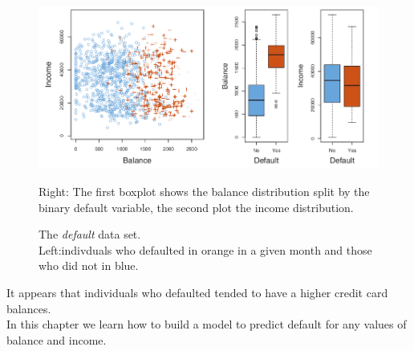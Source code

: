 \begin{figure}[H]
	\begin{center}
		\includegraphics[width=\textwidth]{./chap/1chap/3sec/1images/1DefaultDataSetPlot.png}
	\end{center}
	\caption{The \emph{default} data set.\\Left:indivduals who
defaulted in orange in a given month and those who did not in blue.\\}
Right: The first boxplot shows the balance distribution split by the
binary default variable, the second plot the income distribution.
	\label{fig:fig3.1}
\end{figure}
It appears that individuals who defaulted tended to have a higher 
credit card balances.\\In this chapter we learn how to build a model to
predict default for  any values of balance and income.
